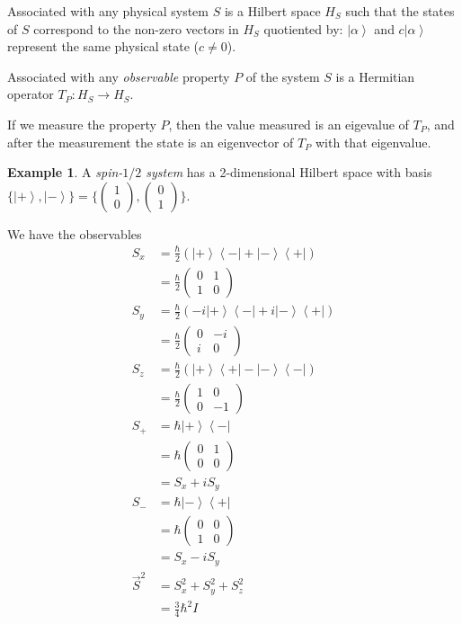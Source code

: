 \documentclass{book}
\theoremstyle{definition}
\newtheorem{ex}[prop]{Example}
\newcommand{\bra}[1]{\ensuremath{\left\langle {#1} \right|}}
\newcommand{\ket}[1]{\ensuremath{\left| {#1} \right\rangle}}
\begin{document}
Associated with any physical system $S$ is a Hilbert space $H_S$ such that the states of $S$ correspond to the non-zero vectors in $H_S$ quotiented by: $\ket{\alpha}$ and $c \ket{\alpha}$ represent the same physical state ($c \neq 0$).

Associated with any \emph{observable} property $P$ of the system $S$ is a Hermitian operator $T_P : H_S \rightarrow H_S$.

If we measure the property $P$, then the value measured is an eigevalue of $T_P$, and after the measurement the state is an eigenvector of $T_P$ with that eigenvalue.

\begin{ex}
A \emph{spin-$1/2$ system} has a 2-dimensional Hilbert space with basis $\{ \ket{+}, \ket{-} \} = \{ \left( \begin{array}{c} 1 \\ 0 \end{array} \right), \left( \begin{array}{c} 0 \\ 1 \end{array} \right) \}$.

We have the observables
\begin{align*}
S_x & = \frac{\hbar}{2} (\ket{+} \bra{-} + \ket{-} \bra{+}) \\
& = \frac{\hbar}{2} \left( \begin{array}{cc}
0 & 1 \\ 1 & 0
\end{array} \right) \\
S_y & = \frac{\hbar}{2} (-i \ket{+} \bra{-} + i \ket{-} \bra{+}) \\
& = \frac{\hbar}{2} \left( \begin{array}{cc}
0 & -i \\
i & 0
\end{array} \right) \\
S_z & = \frac{\hbar}{2} (\ket{+} \bra{+} - \ket{-} \bra{-}) \\
& = \frac{\hbar}{2} \left( \begin{array}{cc} 1 & 0 \\ 0 & -1 \end{array} \right) \\
S_+ & = \hbar \ket{+} \bra{-} \\
& = \hbar \left( \begin{array}{cc}
0 & 1 \\ 0 & 0
\end{array} \right) \\
& = S_x + i S_y \\
S_- & = \hbar \ket{-} \bra{+} \\
& = \hbar \left( \begin{array}{cc}
0 & 0 \\ 1 & 0 \end{array} \right) \\
& = S_x - i S_y \\
\vec{S}^2 & = S_x^2 + S_y^2 + S_z^2 \\
& = \frac{3}{4} \hbar^2 I
\end{align*}


\end{ex}
\end{document}
